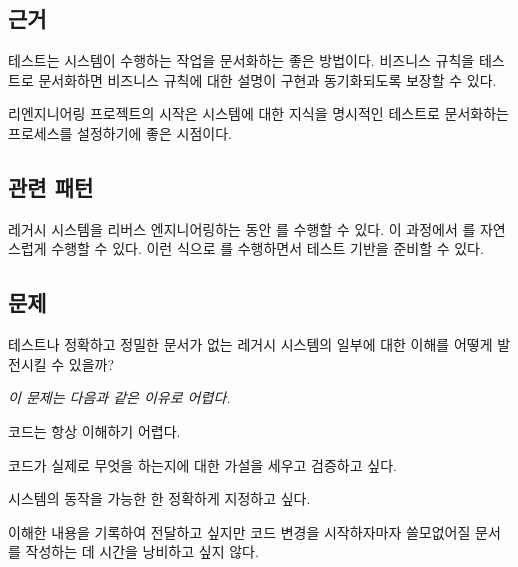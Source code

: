 \documentclass[a4paper,10pt,twoside]{book}
\begin{document}
\subsection*{근거}

테스트는 시스템이 수행하는 작업을 문서화하는 좋은 방법이다. 비즈니스 규칙을 테스트로 문서화하면 비즈니스 규칙에 대한 설명이 구현과 동기화되도록 보장할 수 있다. 

리엔지니어링 프로젝트의 시작은 시스템에 대한 지식을 명시적인 테스트로 문서화하는 프로세스를 설정하기에 좋은 시점이다.

\subsection*{관련 패턴}

레거시 시스템을 리버스 엔지니어링하는 동안 를 수행할 수 있다. 이 과정에서 를 자연스럽게 수행할 수 있다. 이런 식으로 를 수행하면서 테스트 기반을 준비할 수 있다.



\subsection*{문제}

테스트나 정확하고 정밀한 문서가 없는 레거시 시스템의 일부에 대한 이해를 어떻게 발전시킬 수 있을까?

\emph{이 문제는 다음과 같은 이유로 어렵다.}

\begin{bulletlist}
\item 코드는 항상 이해하기 어렵다.
\item 코드가 실제로 무엇을 하는지에 대한 가설을 세우고 검증하고 싶다.
\item 시스템의 동작을 가능한 한 정확하게 지정하고 싶다.
\item 이해한 내용을 기록하여 전달하고 싶지만 코드 변경을 시작하자마자 쓸모없어질 문서를 작성하는 데 시간을 낭비하고 싶지 않다. 
\end{bulletlist}
\end{document}
